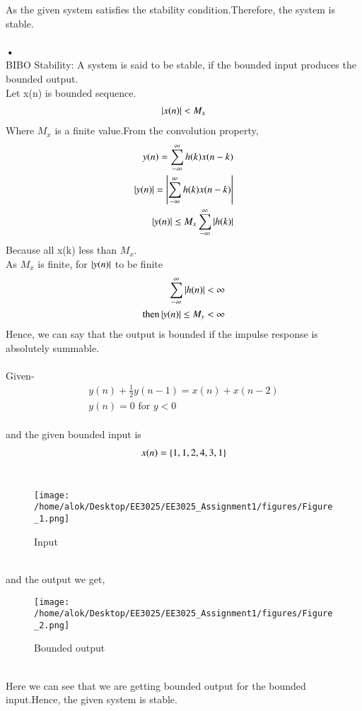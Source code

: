 \documentclass[journal,12pt,twocolumn]{IEEEtran}
\begin{document}
As the given system satisfies the stability condition.Therefore, the system is stable.\\
\\
\textbf{•}
\\
BIBO Stability: A system is said to be stable, if the bounded input produces the bounded output.\\
Let x(n) is bounded sequence.
\begin{align}
\left\vert x(n)\right\vert<M_x
\end{align}
Where $M_x$ is a finite value.From the convolution property,
\begin{align}
 y(n)= \sum_{-\infty}^{\infty}h(k)x(n-k)\\
 \left\vert y(n)\right\vert= \left\vert\sum_{-\infty}^{\infty}h(k)x(n-k)\right\vert\\
 \left\vert y(n)\right\vert \leq M_x\sum_{-\infty}^{\infty}\left\vert h(k)\right\vert 
\end{align}
Because all x(k) less than $M_x$.\\
As $M_x$ is finite, for $\left\vert y(n)\right\vert$ to be finite
\begin{align}
\sum_{-\infty}^{\infty}\left\vert h(n)\right\vert < 
\infty \\
\text{then} \left\vert y(n)\right\vert \leq M_y < \infty 
\end{align}
Hence, we can say that the output is bounded if the impulse response is absolutely summable.\\
\\
Given- 
\begin{align}
y(n)+\frac{1}{2}y(n-1) = x(n)+x(n-2) \\
y(n)=0 \text{ for }y<0
\end{align}\\
and the given bounded input is \\
\begin{align}
x(n) = \left\{1,1,2,4,3,1\right\}
\end{align} \\
\begin{figure}[h!]
    \centering
    \texttt{[image: /home/alok/Desktop/EE3025/EE3025\_Assignment1/figures/Figure\_1.png]}
    \caption{Input}
    \label{xn}
\end{figure}\\
and the output we get,\\
\begin{figure}[h!]
    \centering
    \texttt{[image: /home/alok/Desktop/EE3025/EE3025\_Assignment1/figures/Figure\_2.png]}
    \caption{Bounded output}
    \label{yn}
\end{figure} \\
Here we can see that we are getting bounded output for the bounded input.Hence, the given system is stable.\\
\end{document}
